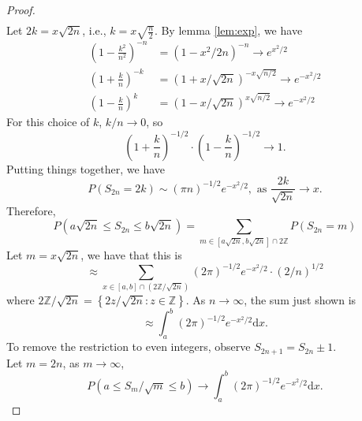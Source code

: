 \begin{proof}
\begin{equation*}
\begin{aligned}
        \end{aligned}
    \end{equation*}
    Let $2k=x\sqrt{2n}$, i.e., $k=x\sqrt{\frac{n}{2}}$. By lemma \ref{lem:exp}, we have
    \begin{equation*}
        \begin{aligned}
            \left(1-\frac{k^{2}}{n^{2}}\right)^{-n} & =\left(1-x^{2} / 2 n\right)^{-n} \rightarrow e^{x^{2} / 2}       \\
            \left(1+\frac{k}{n}\right)^{-k}         & =(1+x / \sqrt{2 n})^{-x \sqrt{n / 2}} \rightarrow e^{-x^{2} / 2} \\
            \left(1-\frac{k}{n}\right)^{k}          & =(1-x / \sqrt{2 n})^{x \sqrt{n / 2}} \rightarrow e^{-x^{2} / 2}
        \end{aligned}
    \end{equation*}
    For this choice of $k$, $k/n \rightarrow 0$, so
    \begin{equation*}
        \left(1+\frac{k}{n}\right)^{-1 / 2} \cdot\left(1-\frac{k}{n}\right)^{-1 / 2} \rightarrow 1.
    \end{equation*}
    Putting things together, we have
    \begin{equation*}
        P\left(S_{2 n}=2 k\right) \sim (\pi n)^{-1 / 2} e^{-x^{2} / 2}, \text{ as } \frac{2k}{\sqrt{2n}} \rightarrow x.
    \end{equation*}
    Therefore,
    \begin{equation*}
        P\left( a\sqrt{2n} \leq S_{2 n} \leq b\sqrt{2 n} \right) = \sum_{m \in \left[a\sqrt{2 n},b\sqrt{2 n}\right] \cap 2\mathbb{Z}} P\left(S_{2 n}=m\right)
    \end{equation*}
    Let $m=x\sqrt{2 n}$, we have that this is
    \begin{equation*}
        \approx \sum_{x \in \left[a,b\right] \cap \left(2\mathbb{Z} / \sqrt{2 n}\right)}(2 \pi)^{-1 / 2} e^{-x^{2} / 2}\cdot(2/n)^{1/2}
    \end{equation*}
    where $2\mathbb{Z} / \sqrt{2 n} = \left\{2z/\sqrt{2n} : z\in\mathbb{Z}\right\}$. As $n\rightarrow\infty$, the sum just shown is
    \begin{equation*}
        \approx \int_{a}^{b}(2 \pi)^{-1 / 2} e^{-x^{2} / 2} \mathrm{d} x.
    \end{equation*}
    To remove the restriction to even integers, observe $S_{2 n +1}=S_{2 n} \pm 1$.\\
    Let $m=2n$, as $m\rightarrow\infty$,
    \begin{equation*}
        P\left(a \leq S_{m} / \sqrt{m} \leq b\right) \rightarrow \int_{a}^{b}(2 \pi)^{-1 / 2} e^{-x^{2} / 2} \mathrm{d} x.
    \end{equation*}
\end{proof}


